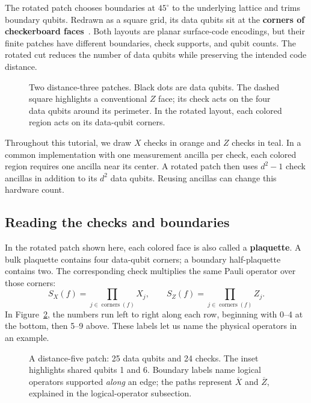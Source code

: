 \documentclass[11pt,a4paper]{article}
\newcommand{\XL}{\overline{X}}
\newcommand{\ZL}{\overline{Z}}
\begin{document}
The rotated patch chooses boundaries at $45^\circ$ to the underlying lattice and trims boundary qubits. Redrawn as a square grid, its data qubits sit at the \textbf{corners of checkerboard faces}~\cite{horsman,tomita}. Both layouts are planar surface-code encodings, but their finite patches have different boundaries, check supports, and qubit counts. The rotated cut reduces the number of data qubits while preserving the intended code distance.


\begin{figure}[!ht]
\centering\layoutcomparison
\caption{Two distance-three patches. Black dots are data qubits. The dashed square highlights a conventional $Z$ face; its check acts on the four data qubits around its perimeter. In the rotated layout, each colored region acts on its data-qubit corners.}
\label{fig:layouts}
\end{figure}


Throughout this tutorial, we draw \textcolor{xc}{$X$ checks in orange} and \textcolor{zc}{$Z$ checks in teal}. In a common implementation with one measurement ancilla per check, each colored region requires one ancilla near its center. A rotated patch then uses $d^2-1$ check ancillas in addition to its $d^2$ data qubits. Reusing ancillas can change this hardware count.

\subsection{Reading the checks and boundaries}
In the rotated patch shown here, each colored face is also called a \textbf{plaquette}. A bulk plaquette contains four data-qubit corners; a boundary half-plaquette contains two. The corresponding check multiplies the same Pauli operator over those corners:
\[
S_X(f)=\prod_{j\in\operatorname{corners}(f)}X_j,
\qquad S_Z(f)=\prod_{j\in\operatorname{corners}(f)}Z_j.
\]
In Figure~\ref{fig:patch}, the numbers run left to right along each row, beginning with 0--4 at the bottom, then 5--9 above. These labels let us name the physical operators in an example.


\begin{figure}[!ht]
\centering\detailedpatch
\caption{A distance-five patch: 25 data qubits and 24 checks. The inset highlights shared qubits 1 and 6. Boundary labels name logical operators supported \emph{along} an edge; the paths represent $\XL$ and $\ZL$, explained in the logical-operator subsection.}
\label{fig:patch}
\end{figure}
\end{document}
